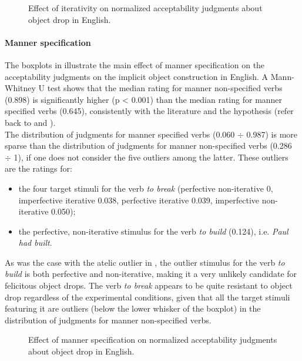 \begin{figure}[htb]
\caption{Effect of iterativity on normalized acceptability judgments about object drop in English.}
    
\end{figure}

\paragraph{Manner specification}
The boxplots in  illustrate the main effect of manner specification on the acceptability judgments on the implicit object construction in English. A Mann-Whitney U test shows that the median rating for manner non-specified verbs (0.898) is significantly higher (p < 0.001) than the median rating for manner specified verbs (0.645), consistently with the literature and the hypothesis (refer back to  and ).\\
The distribution of judgments for manner specified verbs (0.060 $\div$ 0.987) is more sparse than the distribution of judgments for manner non-specified verbs (0.286 $\div$ 1), if one does not consider the five outliers among the latter. These outliers are the ratings for:
\begin{itemize}
    \item the four target stimuli for the verb \textit{to break} (perfective non-iterative 0, imperfective iterative 0.038, perfective iterative 0.039, imperfective non-iterative 0.050);
    \item the perfective, non-iterative stimulus for the verb \textit{to build} (0.124), i.e. \textit{Paul had built}.
\end{itemize}
As was the case with the atelic outlier in , the outlier stimulus for the verb \textit{to build} is both perfective and non-iterative, making it a very unlikely candidate for felicitous object drops. The verb \textit{to break} appears to be quite resistant to object drop regardless of the experimental conditions, given that all the target stimuli featuring it are outliers (below the lower whisker of the boxplot) in the distribution of judgments for manner non-specified verbs.

\begin{figure}[htb]
\caption{Effect of manner specification on normalized acceptability judgments about object drop in English.}
    
\end{figure}


